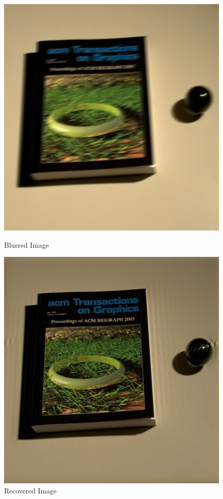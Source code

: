 \documentclass{article}
\begin{document}
    \begin{figure}[!htb]
      \includegraphics[scale=1.25]{./real_world/shan/shan.png}
      \caption{Blurred Image}
    \endminipage\hfill
      \includegraphics[scale=0.3]{./real_world/shan/final.png}
      \caption{Recovered Image}
    \endminipage\hfill
    \end{figure}
    \pagebreak
    
\end{document}

